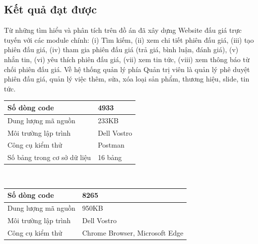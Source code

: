 \documentclass[../DoAn.tex]{subfiles}
\begin{document}
\subsection{Kết quả đạt được}
Từ những tìm hiểu và phân tích trên đồ án đã xây dựng Website đấu giá trực tuyến với các module chính: (i) Tìm kiếm, (ii) xem chi tiết phiên đấu giá, (iii) tạo phiên đấu giá, (iv) tham gia phiên đấu giá (trả giá, bình luận, đánh giá), (v) nhắn tin, (vi) yêu thích phiên đấu giá, (vii) xem tin tức, (viii) xem thông báo từ chối phiên đấu giá. Về hệ thống quản lý phía Quản trị viên là quản lý phê duyệt phiên đấu giá, quản lý việc thêm, sửa, xóa loại sản phẩm, thương hiệu, slide, tin tức.
    \tabletail{\hline}
    \label{bang410}
    \begin{supertabular}{| p{.45\textwidth}| p{.45\textwidth} |} 
    \hline
        Số dòng code& 4933\\\hline
        Dung lượng mã nguồn&233KB \\\hline
        Môi trường lập trình&Dell Vostro \\\hline
        Công cụ kiểm thử & Postman\\\hline
        Số bảng trong cơ sở dữ liệu  &16 bảng \\\hline
    \end{supertabular}
\\
    \tabletail{\hline}
    \label{bang411}
    \begin{supertabular}{| p{.45\textwidth}| p{.45\textwidth} |} 
    \hline
        Số dòng code& 8265\\\hline
        Dung lượng mã nguồn&950KB \\\hline
        Môi trường lập trình&Dell Vostro \\\hline
        Công cụ kiểm thử & Chrome Browser, Microsoft Edge\\\hline
    \end{supertabular}
\\
\end{document}
